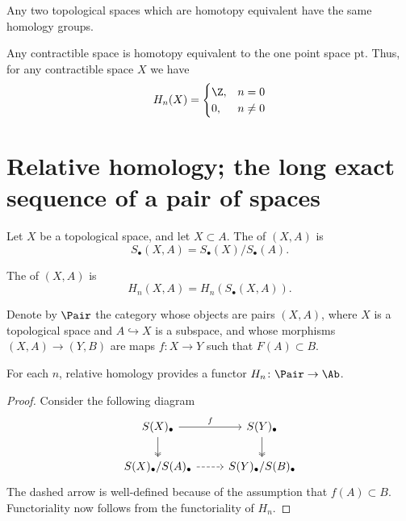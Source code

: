 \documentclass[main.tex]{subfiles}
\begin{document}
\begin{corollary}
  Any two topological spaces which are homotopy equivalent have the same homology groups.
\end{corollary}

\begin{example}
  Any contractible space is homotopy equivalent to the one point space $\mathrm{pt}$. Thus, for any contractible space $X$ we have
  \begin{equation*}
    H_{n}(X) =
    \begin{cases}
      \Z, &n = 0 \\
      0, &n \neq 0
    \end{cases}
  \end{equation*}
\end{example}

\section{Relative homology; the long exact sequence of a pair of spaces}
\label{sec:relative_homology}

\begin{definition}
  \label{def:relative_homology}
  Let $X$ be a topological space, and let $X \subset A$. The  of $(X, A)$ is
  \begin{equation*}
    S_{\bullet}(X, A) = S_{\bullet}(X) / S_{\bullet}(A).
  \end{equation*}

  The  of $(X, A)$ is
  \begin{equation*}
    H_{n}(X, A) = H_{n}(S_{\bullet}(X, A)).
  \end{equation*}
\end{definition}

Denote by $\Pair$ the category whose objects are pairs $(X, A)$, where $X$ is a topological space and $A \hookrightarrow X$ is a subspace, and whose morphisms $(X, A) \to (Y, B)$ are maps $f\colon X \to Y$ such that $F(A) \subset B$.

\begin{lemma}
  \label{lemma:relative_homology_functorial}
  For each $n$, relative homology provides a functor $H_{n}\colon \Pair \to \Ab$.
\end{lemma}
\begin{proof}
  Consider the following diagram
  \begin{equation*}
    \begin{tikzcd}
      S(X)_{\bullet}
      \arrow[r, "f"]
      \arrow[d, two heads]
      & S(Y)_{\bullet}
      \arrow[d, two heads]
      \\
      S(X)_{\bullet}/S(A)_{\bullet}
      \arrow[r, dashed]
      & S(Y)_{\bullet}/S(B)_{\bullet}
    \end{tikzcd}
  \end{equation*}
  The dashed arrow is well-defined because of the assumption that $f(A) \subset B$. Functoriality now follows from the functoriality of $H_{n}$.
\end{proof}
\end{document}
